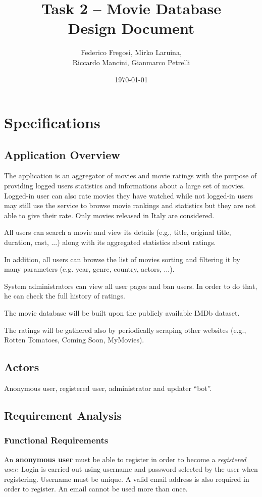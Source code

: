 \documentclass[11pt]{article}
\title{Task 2 -- Movie Database\\ 
	\Large Design Document}
\date{\today}
\author{Federico Fregosi, Mirko Laruina,\\
        Riccardo Mancini, Gianmarco Petrelli}
\begin{document}
\maketitle
\vfill
\tableofcontents
\vfill
\clearpage
\setcounter{page}{1}

\section{Specifications}

\subsection{Application Overview}
The application is an aggregator of movies and movie ratings with the purpose 
of providing logged users statistics and informations about a large set of movies.
Logged-in user can also rate movies they have watched while not logged-in users 
may still use the service to browse movie rankings and statistics but they are not
able to give their rate. Only movies released in Italy are considered.

All users can search a movie and view its details (e.g., title, original title, duration, 
cast, ...) along with its aggregated statistics about ratings. 

In addition, all users can browse the list of movies sorting and filtering it by many parameters
(e.g. year, genre, country, actors, ...).

System administrators can view all user pages and ban users. In order to do that, he can 
check the full history of ratings.

The movie database will be built upon the publicly available IMDb dataset.

The ratings will be gathered also by periodically scraping other websites 
(e.g., Rotten Tomatoes, Coming Soon, MyMovies).

\subsection{Actors}
Anonymous user, registered user, administrator and updater ``bot''.

\subsection{Requirement Analysis}

\subsubsection{Functional Requirements}
An \textbf{anonymous user} must be able to register in order to become a 
\textit{registered user}. Login is carried out using username and password selected 
by the user when registering. Username must be unique. A valid email address is
also required in order to register. An email cannot be used more than once.
\end{document}
